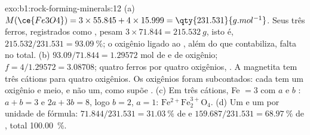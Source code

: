 \begin{solution}{exo:b1:rock-forming-minerals:12}
(a) $M(\ce{Fe3O4}) = 3\times55.845 + 4\times15.999 = \qty{231.531}{g.mol^{-1}}$.
Seus três ferros, registrados como , pesam $3\times71.844 = \qty{215.532}{g}$,
isto é, $215.532/231.531 = \qty{93.09}{\percent}$; o oxigênio ligado ao
, além do que  contabiliza, falta no total.
(b) $93.09/71.844 = 1.29572$ mol de  e de oxigênio; $f =
4/1.29572 = 3.08708$; quatro ferros por quatro oxigênios, . A magnetita tem
três cátions para quatro oxigênios. Os oxigênios foram subcontados: cada
 tem um oxigênio e meio, e não um, como supõe . (c) Em três cátions, Fe $= 3$
com $a$  e $b$ : $a + b = 3$ e $2a + 3b = 8$,
logo $b = 2$, $a = 1$: $\mathrm{Fe^{2+}Fe^{3+}_2O_4}$. (d) Um  e
um  por unidade de fórmula: $71.844/231.531 = \qty{31.03}{\percent}$
de  e $159.687/231.531 = \qty{68.97}{\percent}$ de , total
\qty{100.00}{\percent}.
\end{solution}

